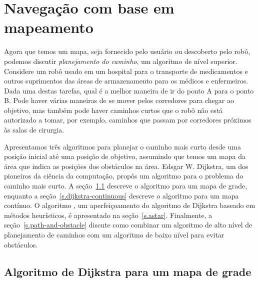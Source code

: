 
\chapter{Navegação com base em mapeamento}\label{ch.map-based}

Agora que temos um mapa, seja fornecido pelo usuário ou descoberto pelo robô, podemos discutir \emph{planejamento do caminho}, um algoritmo de nível superior. Considere um robô usado em um hospital para o transporte de medicamentos e outros suprimentos das áreas de armazenamento para os médicos e enfermeiros. Dada uma destas tarefas, qual é a melhor maneira de ir do ponto A para o ponto B. Pode haver várias maneiras de se mover pelos corredores para chegar ao objetivo, mas também pode haver caminhos curtos que o robô não está autorizado a tomar, por exemplo, caminhos que passam por corredores próximos às salas de cirurgia.

Apresentamos três algoritmos para planejar o caminho mais curto desde uma posição inicial até uma posição de objetivo, assumindo que temos um mapa da área que indica as posições dos obstáculos na área. Edsgar W. Dijkstra, um dos pioneiros da ciência da computação, propôs um algoritmo para o problema do caminho mais curto. A seção~\ref{s.dijkstra-grid} descreve o algoritmo para um mapa de grade, enquanto a seção~\ref{s.dijkstra-continuous} descreve o algoritmo para um mapa contínuo. O algoritmo \astar{}, um aperfeiçoamento do algoritmo de Dijkstra baseado em métodos heurísticos, é apresentado na seção~\ref{s.astar}. Finalmente, a seção~\ref{s.path-and-obstacle} discute como combinar um algoritmo de alto nível de planejamento de caminhos com um algoritmo de baixo nível para evitar obstáculos.

\section{Algoritmo de Dijkstra para um mapa de grade}\label{s.dijkstra-grid}

